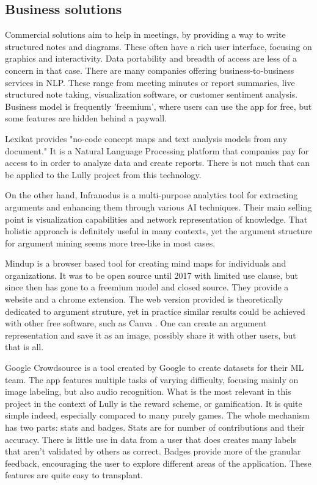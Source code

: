 \documentclass{report}
\begin{document}
\subsection{Business solutions}
Commercial solutions aim to help in meetings, by providing a way to write structured notes and diagrams. These often have a rich user interface, focusing on graphics and interactivity.
Data portability and breadth of access are less of a concern in that case.
There are many companies offering business-to-business services in NLP.  These range from meeting minutes or report summaries, live structured note taking, visualization software, or customer sentiment analysis.  Business model is frequently 'freemium', where users can use the app for free, but some features are hidden behind a paywall.

Lexikat \cite{noauthor_lexikat_nodate} provides "no-code concept maps and text analysis models from any document." It is a Natural Language Processing platform that companies pay for access to in order to analyze data and create reports. There is not much that can be applied to the Lully project from this technology.

On the other hand, Infranodus \cite{noauthor_infranodus_nodate} is a multi-purpose analytics tool for extracting arguments and enhancing them through various AI techniques. Their main selling point is visualization capabilities and network representation of knowledge. That holistic approach is definitely useful in many contexts, yet the argument structure for argument mining seems more tree-like in most cases.

Mindup \cite{noauthor_mindmup_nodate} is a browser based tool for creating mind maps for individuals and organizations. It was to be open source until 2017 with limited use clause, but since then has gone to a freemium model and closed source. They provide a website and a chrome extension. The web version provided is theoretically dedicated to argument struture, yet in practice similar results could be achieved with other free software, such as Canva \cite{noauthor_home_nodate}. One can create an argument representation and save it as an image, possibly share it with other users, but that is all.

Google Crowdsource \cite{noauthor_crowdsource_2023} is a tool created by Google to create datasets for their ML team. The app features multiple tasks of varying difficulty, focusing mainly on image labeling, but also audio recognition. What is the most relevant in this project in the context of Lully is the reward scheme, or gamification. It is quite simple indeed, especially compared to many purely games. The whole mechanism has two parts: stats and badges. Stats are for number of contributions and their accuracy. There is little use in data from a user that does creates many labels that aren't validated by others as correct. Badges provide more of the granular feedback, encouraging the user to explore different areas of the application. These features are quite easy to transplant.
\end{document}
